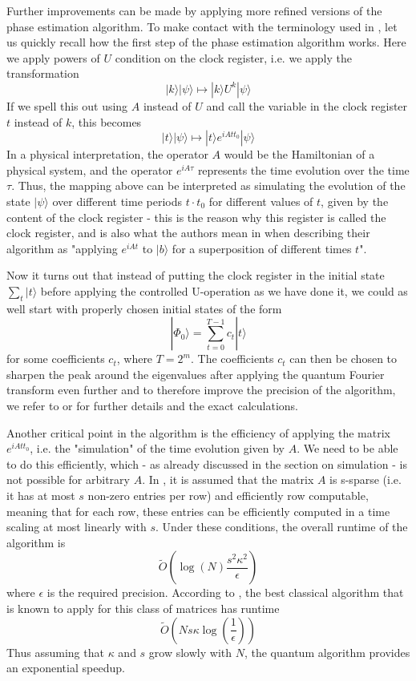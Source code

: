 \documentclass[a4paper, draft]{article}
\theoremstyle{own}
\theoremstyle{remark}
\begin{document}
Further improvements can be made by applying more refined versions of the phase estimation algorithm. To make contact with the terminology used in \cite{HHL2009}, let us quickly recall how the first step of the phase estimation algorithm works. Here we apply powers of $U$ condition on the clock register, i.e. we apply the transformation
$$
|k \rangle |\psi \rangle \mapsto |k \rangle U^k |\psi \rangle
$$
If we spell this out using $A$ instead of $U$ and call the variable in the clock register $t$ instead of $k$, this becomes
$$
|t \rangle |\psi \rangle \mapsto |t \rangle e^{iAt t_0} |\psi \rangle
$$
In a physical interpretation, the operator $A$ would be the Hamiltonian of a physical system, and the operator $e^{iA\tau}$ represents the time evolution over the time $\tau$. Thus, the mapping above can be interpreted as simulating the evolution of the state $|\psi \rangle$ over different time periods $t \cdot t_0$ for different values of $t$, given by the content of the clock register - this is the reason why this register is called the clock register, and is also what the authors mean in \cite{HHL2009} when describing their algorithm as "applying $e^{iAt}$ to $|b \rangle$ for a superposition of different times $t$".

Now it turns out that instead of putting the clock register in the initial state $\sum_t |t \rangle$ before applying the controlled U-operation as we have done it, we could as well start with properly chosen initial states of the form
$$
|\Phi_0 \rangle = \sum_{t=0}^{T-1} c_t |t \rangle
$$
for some coefficients $c_t$, where $T = 2^m$. The coefficients $c_t$ can then be chosen to sharpen the peak around the eigenvalues after applying the quantum Fourier transform even further and to therefore improve the precision of the algorithm, we refer to \cite{HHL2009} or \cite{HHLPrimer} for further details and the exact calculations.

Another critical point in the algorithm is the efficiency of applying the matrix $e^{iAt t_0}$, i.e. the "simulation" of the time evolution given by $A$. We need to be able to do this efficiently, which - as already discussed in the section on simulation - is not possible for arbitrary $A$. In \cite{HHL2009}, it is assumed that the matrix $A$ is s-sparse (i.e. it has at most $s$ non-zero entries per row) and efficiently row computable, meaning that for each row, these entries can be efficiently computed in a time scaling at most linearly with $s$. Under these conditions, the overall runtime of the algorithm is
$$
\tilde{O}(\log(N)  \frac{s^2 \kappa^2}{\epsilon})
$$
where $\epsilon$ is the required precision. According to \cite{HHLPrimer}, the best classical algorithm that is known to apply for this class of matrices has runtime
$$
\tilde{O}(N s \kappa \log (\frac{1}{\epsilon}))
$$
Thus assuming that $\kappa$ and $s$ grow slowly with $N$, the quantum algorithm provides an exponential speedup.
\end{document}

